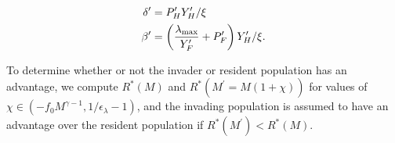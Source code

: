\documentclass[twocolumn,preprintnumbers,amsmath,amssymb,superscriptaddress]{revtex4}
\begin{document}
\begin{bibunit}[unsrt]
\begin{align}
  \delta^\prime &= P^\prime_{H}Y^\prime_{H}/\xi \\ \nonumber
  \beta^\prime &= \left(\frac{\lambda_{\rm max}}{Y^\prime_{F}}+P^\prime_{F} \right)Y^\prime_{H}/\xi.
\end{align}

To determine whether or not the invader or resident population has an advantage, we compute $R^*(M)$ and $R^*(M^\prime=M(1+\chi))$ for values of $\chi \in (-f_0M^{\gamma-1},1/\epsilon_{\lambda}-1)$, and the invading population is assumed to have an advantage over the resident population if $R^*(M^\prime)<R^*(M)$.



\end{bibunit}
\end{document}
